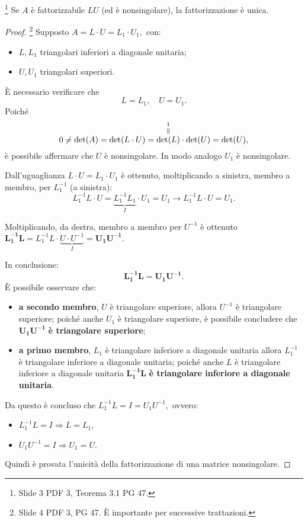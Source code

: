 \begin{theorem}\footnote{Slide 3 PDF 3, Teorema 3.1 PG 47.}
    Se $A$ è fattorizzabile $LU$ (ed è nonsingolare), la fattorizzazione è unica. 
\end{theorem}
\begin{proof}
    \footnote{Slide 4 PDF 3, PG 47. È importante per successive trattazioni.} Supposto $A=L\cdot U = L_1\cdot U_1,$ con:
    \begin{itemize}
        \item $L, L_1$ triangolari inferiori a diagonale unitaria;
        \item $U, U_1$ triangolari superiori.
    \end{itemize}
    È necessario verificare che
    \begin{equation*}
        L=L_1,\quad U=U_1.
    \end{equation*}
    Poiché
    \begin{equation*}
        0\neq\det(A)=\det(L\cdot U)= \equaltoup{\det(L)}{1}\cdot \det(U)=\det(U),
    \end{equation*}
    è possibile affermare che $U$ è nonsingolare. In modo analogo $U_1$ è nonsingolare.

    Dall'uguaglianza $L\cdot U= L_1\cdot U_1$ è ottenuto, moltiplicando a sinistra, membro a membro, per $L_1^{-1}$ (a sinistra): 
    \begin{equation*}
        L_1^{-1}L\cdot U= \underbrace{L_1^{-1}L_1}_{I}\cdot U_1=U_1\longrightarrow L_1^{-1}L\cdot U= U_1.
    \end{equation*}

    Moltiplicando, da destra, membro a membro per $U^{-1}$ è ottenuto $\boldsymbol{L_1^{-1}L=}L_1^{-1}L\cdot \underbrace{U\cdot U^{-1}}_I= \boldsymbol{U_1U^{-1}}.$
    
    In conclusione: \begin{equation*}
        \boldsymbol{L_1^{-1}L}=\boldsymbol{U_1U^{-1}}.
    \end{equation*}
    È possibile osservare che:
    \begin{itemize}
        \item \textbf{a secondo membro}, $U$ è triangolare superiore, allora $U^{-1}$ è triangolare superiore; poiché anche $U_1$ è triangolare superiore, è possibile concludere che $\boldsymbol{U_1U^{-1}}$ \textbf{è triangolare superiore};
        \item \textbf{a primo membro}, $L_1$ è triangolare inferiore a diagonale unitaria allora $L_1^{-1}$ è triangolare inferiore a diagonale unitaria; poiché anche $L$ è triangolare inferiore a diagonale unitaria $\boldsymbol{L_1^{-1}L}$ \textbf{è triangolare inferiore a diagonale unitaria}.
    \end{itemize}
    Da questo è concluso che $L_1^{-1}L=I=U_1U^{-1},$ ovvero:
    \begin{itemize}
        \item $L_1^{-1}L=I\Rightarrow L=L_1$,
        \item $U_1U^{-1}=I\Rightarrow U_1=U.$
    \end{itemize}
    Quindi è provata l'unicità della fattorizzazione di una matrice nonsingolare.
\end{proof}

